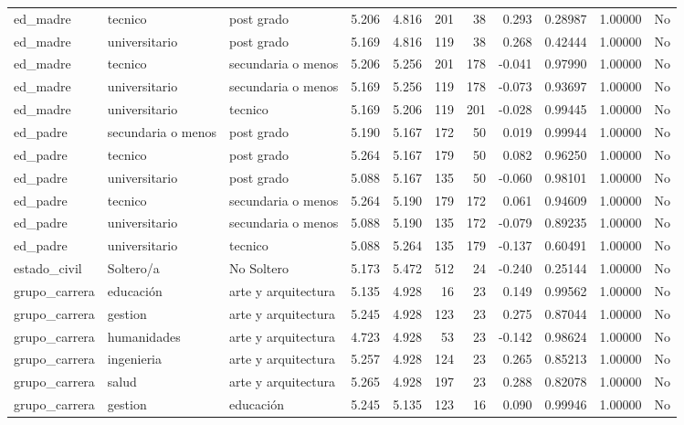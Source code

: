 \documentclass[
  letterpaper,
  DIV=11,
  numbers=noendperiod]{scrartcl}
\begin{document}
\begin{table}
\begin{tabular*}{\linewidth}{@{\extracolsep{\fill}}lllrrrrrrrl}
ed\_madre & tecnico & post grado & 5.206 & 4.816 & 201 & 38 & 0.293 & 0.28987 & 1.00000 & No \\ 
ed\_madre & universitario & post grado & 5.169 & 4.816 & 119 & 38 & 0.268 & 0.42444 & 1.00000 & No \\ 
ed\_madre & tecnico & secundaria o menos & 5.206 & 5.256 & 201 & 178 & -0.041 & 0.97990 & 1.00000 & No \\ 
ed\_madre & universitario & secundaria o menos & 5.169 & 5.256 & 119 & 178 & -0.073 & 0.93697 & 1.00000 & No \\ 
ed\_madre & universitario & tecnico & 5.169 & 5.206 & 119 & 201 & -0.028 & 0.99445 & 1.00000 & No \\ 
ed\_padre & secundaria o menos & post grado & 5.190 & 5.167 & 172 & 50 & 0.019 & 0.99944 & 1.00000 & No \\ 
ed\_padre & tecnico & post grado & 5.264 & 5.167 & 179 & 50 & 0.082 & 0.96250 & 1.00000 & No \\ 
ed\_padre & universitario & post grado & 5.088 & 5.167 & 135 & 50 & -0.060 & 0.98101 & 1.00000 & No \\ 
ed\_padre & tecnico & secundaria o menos & 5.264 & 5.190 & 179 & 172 & 0.061 & 0.94609 & 1.00000 & No \\ 
ed\_padre & universitario & secundaria o menos & 5.088 & 5.190 & 135 & 172 & -0.079 & 0.89235 & 1.00000 & No \\ 
ed\_padre & universitario & tecnico & 5.088 & 5.264 & 135 & 179 & -0.137 & 0.60491 & 1.00000 & No \\ 
estado\_civil & Soltero/a & No Soltero & 5.173 & 5.472 & 512 & 24 & -0.240 & 0.25144 & 1.00000 & No \\ 
grupo\_carrera & educación & arte y arquitectura & 5.135 & 4.928 & 16 & 23 & 0.149 & 0.99562 & 1.00000 & No \\ 
grupo\_carrera & gestion & arte y arquitectura & 5.245 & 4.928 & 123 & 23 & 0.275 & 0.87044 & 1.00000 & No \\ 
grupo\_carrera & humanidades & arte y arquitectura & 4.723 & 4.928 & 53 & 23 & -0.142 & 0.98624 & 1.00000 & No \\ 
grupo\_carrera & ingenieria & arte y arquitectura & 5.257 & 4.928 & 124 & 23 & 0.265 & 0.85213 & 1.00000 & No \\ 
grupo\_carrera & salud & arte y arquitectura & 5.265 & 4.928 & 197 & 23 & 0.288 & 0.82078 & 1.00000 & No \\ 
grupo\_carrera & gestion & educación & 5.245 & 5.135 & 123 & 16 & 0.090 & 0.99946 & 1.00000 & No \\ 

\end{tabular*}
\end{table}
\end{document}
